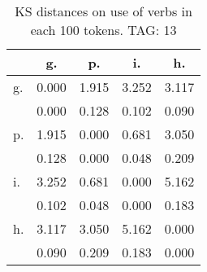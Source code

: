 \begin{table}[h!]
\begin{center}
\begin{tabular}{| l | c | c | c | c |}\hline
 & g. & p. & i. & h. \\\hline
g. & 0.000  & 1.915  & 3.252  & 3.117 \\\hline
 & 0.000  & 0.128  & 0.102  & 0.090 \\\hline
p. & 1.915  & 0.000  & 0.681  & 3.050 \\\hline
 & 0.128  & 0.000  & 0.048  & 0.209 \\\hline
i. & 3.252  & 0.681  & 0.000  & 5.162 \\\hline
 & 0.102  & 0.048  & 0.000  & 0.183 \\\hline
h. & 3.117  & 3.050  & 5.162  & 0.000 \\\hline
 & 0.090  & 0.209  & 0.183  & 0.000 \\\hline
\end{tabular}
\caption{KS distances on use of verbs in each 100 tokens. TAG: 13}
\end{center}
\end{table}